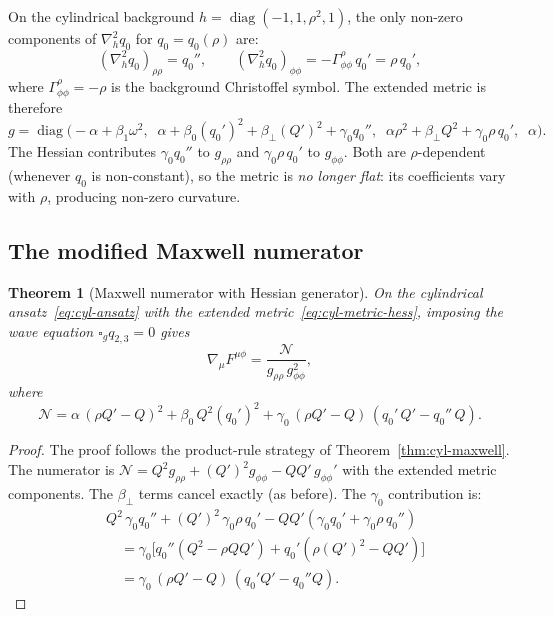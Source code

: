\documentclass[pdflatex,sn-mathphys-num]{sn-jnl}
\theoremstyle{thmstyleone}%
\newtheorem{theorem}{Theorem}[section]
\theoremstyle{thmstyletwo}%
\theoremstyle{thmstylethree}%
\newcommand{\nn}{\nabla}
\numberwithin{equation}{section}
\begin{document}
On the cylindrical background $h = \operatorname{diag}(-1,1,\rho^2,1)$,
the only non-zero components of $\nn^2_h q_0$ for
$q_0 = q_0(\rho)$ are:
\begin{equation}
\label{eq:hess-q0-cyl}
(\nn^2_h q_0)_{\rho\rho} = q_0'',
\qquad
(\nn^2_h q_0)_{\phi\phi}
= -\Gamma^\rho_{\phi\phi}\,q_0' = \rho\,q_0',
\end{equation}
where $\Gamma^\rho_{\phi\phi} = -\rho$ is the background
Christoffel symbol.  The extended metric is therefore
\begin{equation}
\label{eq:cyl-metric-hess}
g = \operatorname{diag}\!\bigl(
  -\alpha+\beta_1\omega^2,\;\;
  \alpha+\beta_0(q_0')^2+\beta_\perp(Q')^2+\gamma_0 q_0'',\;\;
  \alpha\rho^2+\beta_\perp Q^2+\gamma_0\rho\,q_0',\;\;
  \alpha
\bigr).
\end{equation}
The Hessian contributes $\gamma_0 q_0''$ to $g_{\rho\rho}$ and
$\gamma_0\rho\,q_0'$ to $g_{\phi\phi}$.  Both are
$\rho$-dependent (whenever $q_0$ is non-constant), so the
metric is \emph{no longer flat}: its coefficients vary with
$\rho$, producing non-zero curvature.

\subsection{The modified Maxwell numerator}

\begin{theorem}[Maxwell numerator with Hessian generator]
\label{thm:hessian-numerator}
On the cylindrical ansatz~\eqref{eq:cyl-ansatz} with the
extended metric~\eqref{eq:cyl-metric-hess}, imposing the
wave equation $\square_g q_{2,3} = 0$ gives
\begin{equation}
\label{eq:hessian-numerator}
\nn_\mu F^{\mu\phi}
= \frac{\mathcal{N}}{g_{\rho\rho}\,g_{\phi\phi}^2},
\end{equation}
where
\begin{equation}
\label{eq:hessian-N}
\mathcal{N}
= \alpha\,(\rho Q'-Q)^2
  + \beta_0\,Q^2(q_0')^2
  + \gamma_0\,(\rho Q'-Q)\,(q_0'\,Q' - q_0''\,Q).
\end{equation}
\end{theorem}

\begin{proof}
The proof follows the product-rule strategy of
Theorem~\ref{thm:cyl-maxwell}.  The numerator is
$\mathcal{N} = Q^2 g_{\rho\rho} + (Q')^2 g_{\phi\phi}
- QQ'\,g_{\phi\phi}'$
with the extended metric components.  The $\beta_\perp$ terms
cancel exactly (as before).  The $\gamma_0$ contribution is:
\begin{align*}
&Q^2\,\gamma_0 q_0'' + (Q')^2\,\gamma_0\rho\,q_0'
- QQ'(\gamma_0 q_0' + \gamma_0\rho\,q_0'') \\
&\quad= \gamma_0\bigl[
  q_0''(Q^2 - \rho QQ') + q_0'(\rho(Q')^2 - QQ')
\bigr] \\
&\quad= \gamma_0\,(\rho Q'-Q)\,(q_0' Q' - q_0'' Q).
\end{align*}
\end{proof}
\end{document}
